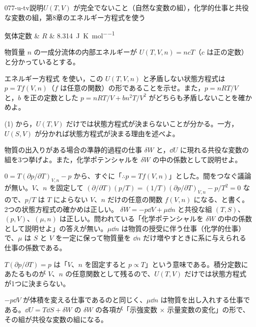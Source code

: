 \documentclass[uplatex,dvipdfmx,a4paper,11pt]{jsarticle}
\begin{document}
\mondaihen
{}
\begin{mondai}{077-u-tv}{説明}{$U(T,V)$ が完全でないこと（自然な変数の組），化学的仕事と共役な変数の組，第8章のエネルギー方程式を使う}
\begin{teisuu}
  気体定数 & $R$ & \qty{8.314}{\joule\per\kelvin\per\mole}\\
\end{teisuu}
物質量 $n$ の一成分流体の内部エネルギーが $U(T,V,n) = ncT$（$c$ は正の定数）と分かっているとする。
  \begin{shoumon}
    \item エネルギー方程式  を使い，この $U(T,V,n)$ と矛盾しない状態方程式は $p = Tf(V,n)$（$f$ は任意の関数）の形であることを示せ。また，$p = nRT/V$ と，$b$ を正の定数とした $p = nRT/V + bn^{2}T/V^{2}$ がどちらも矛盾しないことを確かめよ。
    \item (1) から，$U(T,V)$ だけでは状態方程式が決まらないことが分かる。一方，$U(S,V)$ が分かれば状態方程式が決まる理由を述べよ。
    \item 物質の出入りがある場合の準静的過程の仕事 $\delta W$ と，$\dd U$ に現れる共役な変数の組を3つ挙げよ。また，化学ポテンシャルを $\delta W$ の中の係数として説明せよ。
  \end{shoumon}

\begin{kotaeran}
   $0=T(\partial p/\partial T)_{V,n}-p$ から、すぐに「$\therefore p=Tf(V,n)$」とした。間をつなぐ議論が無い。$V$、$n$ を固定して $(\partial/\partial T)(p/T)=(1/T)(\partial p/\partial T)_{V,n}-p/T^{2}=0$ なので、$p/T$ は $T$ によらない $V$、$n$ だけの任意の関数 $f(V,n)$ になる、と書く。2つの状態方程式の確かめは正しい。
   $\delta W=-p\dd V+\mu\dd n$ と共役な組 $(T,S)$、$(p,V)$、$(\mu,n)$ は正しい。問われている「化学ポテンシャルを $\delta W$ の中の係数として説明せよ」の答えが無い。$\mu\dd n$ は物質の授受に伴う仕事（化学的仕事）で、$\mu$ は $S$ と $V$ を一定に保って物質量を $\dd n$ だけ増やすときに系に与えられる仕事の係数である。
\end{kotaeran}
\begin{rikai}
  \item $T(\partial p/\partial T)=p$ は「$V$、$n$ を固定すると $p\propto T$」という意味である。積分定数にあたるものが $V$、$n$ の任意関数として残るので、$U(T,V)$ だけでは状態方程式が1つに決まらない。
  \item $-p\dd V$ が体積を変える仕事であるのと同じく、$\mu\dd n$ は物質を出し入れする仕事である。$\dd U=T\dd S+\delta W$ の $\delta W$ の各項が「示強変数 $\times$ 示量変数の変化」の形で、その組が共役な変数の組になる。
\end{rikai}
\end{mondai}
\end{document}
